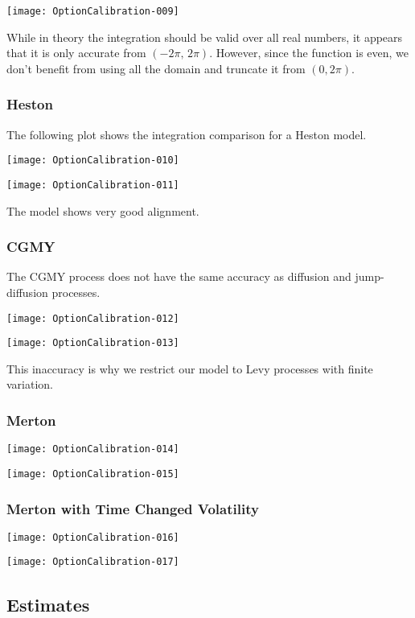 \documentclass{article}
\begin{document}
\texttt{[image: OptionCalibration-009]}




While in theory the integration should be valid over all real numbers, it appears that it is only accurate from \((-2\pi,\,2\pi)\).  However, since the function is even, we don't benefit from using all the domain and truncate it from \((0, 2 \pi)\).

\subsubsection{Heston}

The following plot shows the integration comparison for a Heston model.

\texttt{[image: OptionCalibration-010]}

\texttt{[image: OptionCalibration-011]}

The model shows very good alignment.


\subsubsection{CGMY}

The CGMY process does not have the same accuracy as diffusion and jump-diffusion processes.

\texttt{[image: OptionCalibration-012]}

\texttt{[image: OptionCalibration-013]}

This inaccuracy is why we restrict our model to Levy processes with finite variation.  

\subsubsection{Merton}

\texttt{[image: OptionCalibration-014]}

\texttt{[image: OptionCalibration-015]}


\subsubsection{Merton with Time Changed Volatility}
\texttt{[image: OptionCalibration-016]}

\texttt{[image: OptionCalibration-017]}

\subsection{Estimates}
\end{document}
